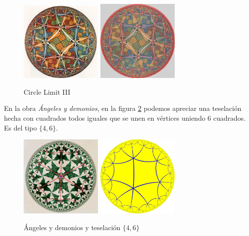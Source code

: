 \documentclass{article}
\theoremstyle{plain}
\theoremstyle{definition}
\theoremstyle{remark}
\begin{document}
\begin{figure}[ht!]
  \centering
  \includegraphics[width=40mm]{./limit3.jpg}
  \includegraphics[width=40mm]{./limit3overlay.png}
  \caption{Circle Limit III\label{limit3}}
\end{figure}

En la obra \textit{Ángeles y demonios}, en la figura \ref{angels} podemos
apreciar una teselación hecha con cuadrados todos iguales que se unen en
vértices uniendo $6$ cuadrados. Es del tipo $\{4,6\}$.

\begin{figure}[ht!]
  \centering
  \includegraphics[width=40mm]{./angels.png}
  \includegraphics[width=40mm]{./tiling-4-6.png}
  \caption{Ángeles y demonios y teselación $\{4,6\}$ \label{angels}}
\end{figure}

\end{document}
